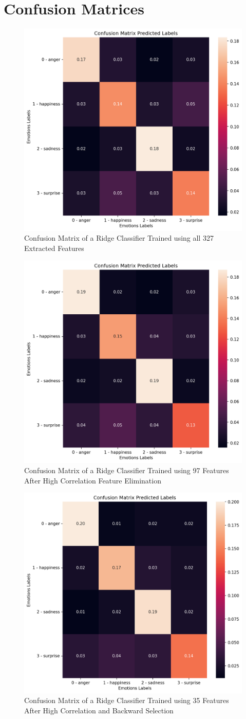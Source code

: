 \section{Confusion Matrices}  \label{confusionMatrices}

\begin{figure}[H]
	\centering
	\includegraphics[width=.55\linewidth]{figs/appendix/feature_selection/cmAll.png}
	\caption{Confusion Matrix of a Ridge Classifier Trained using all 327 Extracted Features}
	\label{fig:confMatrix1}
\end{figure}

\begin{figure}[H]
	\centering
	\includegraphics[width=.55\linewidth]{figs/appendix/feature_selection/cmSec.png}
	\caption{Confusion Matrix of a Ridge Classifier Trained using 97 Features After High Correlation Feature Elimination}
	\label{fig:confMatrix2}
\end{figure}


\begin{figure}[H]
	\centering
	\includegraphics[width=.55\linewidth]{figs/appendix/feature_selection/cmThird.png}
	\caption{Confusion Matrix of a Ridge Classifier Trained using 35 Features After High Correlation and Backward Selection}
	\label{fig:confMatrix3}
\end{figure}


